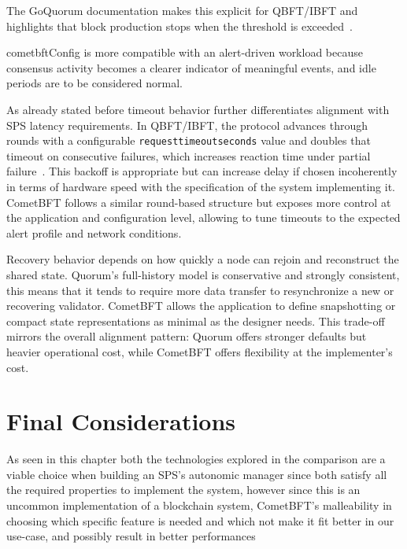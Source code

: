 The GoQuorum documentation makes this explicit for QBFT/IBFT and highlights that block production stops when the threshold is exceeded~\cite{QBFTCons90:online}.

{cometbftConfig} is more compatible with an alert-driven workload because consensus activity becomes a clearer indicator of meaningful events, and idle periods are to be considered normal.

As already stated before timeout behavior further differentiates alignment with SPS latency requirements. In QBFT/IBFT, the protocol advances through rounds with a configurable \texttt{requesttimeoutseconds} value and doubles that timeout on consecutive failures, which increases reaction time under partial failure~\cite{QBFTCons90:online}. This backoff is appropriate but can increase delay if chosen incoherently in terms of hardware speed with the specification of the system implementing it. CometBFT follows a similar round-based structure but exposes more control at the application and configuration level, allowing to tune timeouts to the expected alert profile and network conditions.

Recovery behavior depends on how quickly a node can rejoin and reconstruct the shared state. Quorum's full-history model is conservative and strongly consistent, this means that it tends to require more data transfer to resynchronize a new or recovering validator. CometBFT allows the application to define snapshotting or compact state representations as minimal as the designer needs. This trade-off mirrors the overall alignment pattern: Quorum offers stronger defaults but heavier operational cost, while CometBFT offers flexibility at the implementer's cost.

\section{Final Considerations}
As seen in this chapter both the technologies explored in the comparison are a viable choice when building an SPS's autonomic manager since both satisfy all the required properties to implement the system, however since this is an uncommon implementation of a blockchain system, CometBFT's malleability in choosing which specific feature is needed and which not make it fit better in our use-case, and possibly result in better performances
